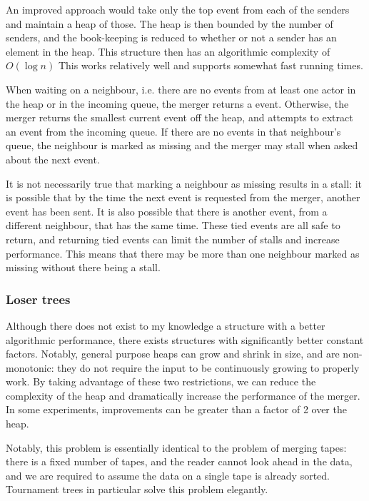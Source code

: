 An improved approach would take only the top event from each of the senders and maintain a heap of those.
The heap is then bounded by the number of senders, and the book-keeping is reduced to whether or not a sender has an element in the heap.
This structure then has an algorithmic complexity of $O\left(\log n\right)$
This works relatively well and supports somewhat fast running times. %

When waiting on a neighbour, i.e. there are no events from at least one actor in the heap or in the incoming queue, the merger returns a  event.
Otherwise, the merger returns the smallest current event off the heap, and attempts to extract an event from the incoming queue.
If there are no events in that neighbour's queue, the neighbour is marked as missing and the merger may stall when asked about the next event.

It is not necessarily true that marking a neighbour as missing results in a stall: it is possible that by the time the next event is requested from the merger, another event has been sent.
It is also possible that there is another event, from a different neighbour, that has the same time.
These tied events are all safe to return, and returning tied events can limit the number of stalls and increase performance.
This means that there may be more than one neighbour marked as missing without there being a stall.

\subsubsection{Loser trees}

Although there does not exist to my knowledge a structure with a better algorithmic performance, there exists structures with significantly better constant factors.
Notably, general purpose heaps can grow and shrink in size, and are non-monotonic: they do not require the input to be continuously growing to properly work.
By taking advantage of these two restrictions, we can reduce the complexity of the heap and dramatically increase the performance of the merger.
In some experiments, improvements can be greater than a factor of 2 over the heap.

Notably, this problem is essentially identical to the problem of merging tapes: there is a fixed number of tapes, and the reader cannot look ahead in the data, and we are required to assume the data on a single tape is already sorted.
Tournament trees in particular solve this problem elegantly.

